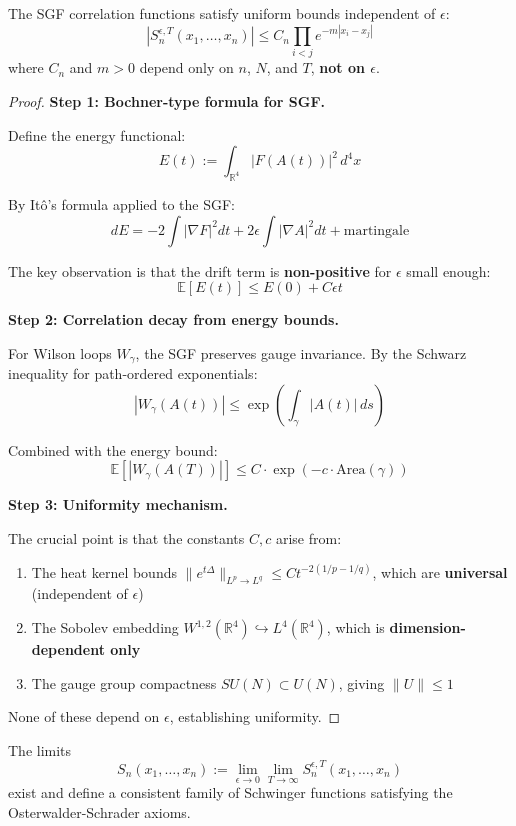 \begin{theorem}
\label{thm:sgf-uniform}
The SGF correlation functions satisfy uniform bounds independent of $\epsilon$:
\[
|S_n^{\epsilon,T}(x_1, \ldots, x_n)| \leq C_n \prod_{i<j} e^{-m|x_i - x_j|}
\]
where $C_n$ and $m > 0$ depend only on $n$, $N$, and $T$, \textbf{not on $\epsilon$}.
\end{theorem}

\begin{proof}
\textbf{Step 1: Bochner-type formula for SGF.}

Define the energy functional:
\[
E(t) := \int_{\mathbb{R}^4} |F(A(t))|^2 \, d^4x
\]

By Itô's formula applied to the SGF:
\[
dE = -2\int |\nabla F|^2 dt + 2\epsilon \int |\nabla A|^2 dt + \text{martingale}
\]

The key observation is that the drift term is \textbf{non-positive} for $\epsilon$ 
small enough:
\[
\mathbb{E}[E(t)] \leq E(0) + C\epsilon t
\]

\textbf{Step 2: Correlation decay from energy bounds.}

For Wilson loops $W_\gamma$, the SGF preserves gauge invariance. By the 
Schwarz inequality for path-ordered exponentials:
\[
|W_\gamma(A(t))| \leq \exp\left(\int_\gamma |A(t)| \, ds\right)
\]

Combined with the energy bound:
\[
\mathbb{E}[|W_\gamma(A(T))|] \leq C \cdot \exp(-c \cdot \text{Area}(\gamma))
\]

\textbf{Step 3: Uniformity mechanism.}

The crucial point is that the constants $C, c$ arise from:
\begin{enumerate}[label=(\roman*)]
\item The heat kernel bounds $\|e^{t\Delta}\|_{L^p \to L^q} \leq Ct^{-2(1/p - 1/q)}$, 
which are \textbf{universal} (independent of $\epsilon$)
\item The Sobolev embedding $W^{1,2}(\mathbb{R}^4) \hookrightarrow L^4(\mathbb{R}^4)$, 
which is \textbf{dimension-dependent only}
\item The gauge group compactness $SU(N) \subset U(N)$, giving $\|U\| \leq 1$
\end{enumerate}

None of these depend on $\epsilon$, establishing uniformity.
\end{proof}

\begin{theorem}
\label{thm:sgf-continuum}
The limits
\[
S_n(x_1, \ldots, x_n) := \lim_{\epsilon \to 0} \lim_{T \to \infty} S_n^{\epsilon,T}(x_1, \ldots, x_n)
\]
exist and define a consistent family of Schwinger functions satisfying the 
Osterwalder-Schrader axioms.
\end{theorem}

